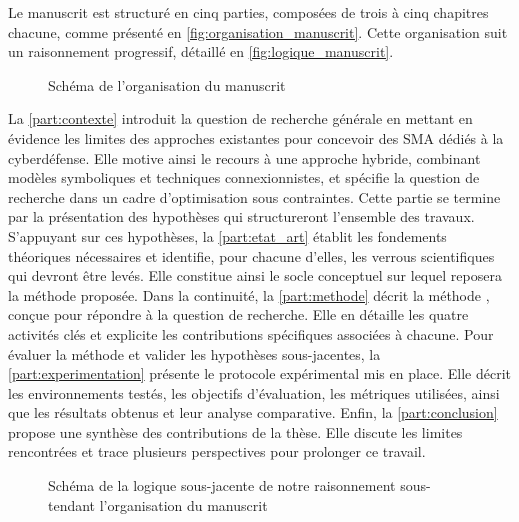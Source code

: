 \noindent
Le manuscrit est structuré en cinq parties, composées de trois à cinq chapitres chacune, comme présenté en \autoref{fig:organisation_manuscrit}. Cette organisation suit un raisonnement progressif, détaillé en \autoref{fig:logique_manuscrit}.


\begin{figure}[h!]
    \centering
    \resizebox{\textwidth}{!}{%
        
    }
    \caption{Schéma de l'organisation du manuscrit}
    \label{fig:organisation_manuscrit}
\end{figure}

\noindent
La \autoref{part:contexte} introduit la question de recherche générale en mettant en évidence les limites des approches existantes pour concevoir des SMA dédiés à la cyberdéfense. Elle motive ainsi le recours à une approche hybride, combinant modèles symboliques et techniques connexionnistes, et spécifie la question de recherche dans un cadre d’optimisation sous contraintes. Cette partie se termine par la présentation des hypothèses qui structureront l’ensemble des travaux.
%
S’appuyant sur ces hypothèses, la \autoref{part:etat_art} établit les fondements théoriques nécessaires et identifie, pour chacune d’elles, les verrous scientifiques qui devront être levés. Elle constitue ainsi le socle conceptuel sur lequel reposera la méthode proposée.
%
Dans la continuité, la \autoref{part:methode} décrit la méthode , conçue pour répondre à la question de recherche. Elle en détaille les quatre activités clés et explicite les contributions spécifiques associées à chacune.
%
Pour évaluer la méthode et valider les hypothèses sous-jacentes, la \autoref{part:experimentation} présente le protocole expérimental mis en place. Elle décrit les environnements testés, les objectifs d’évaluation, les métriques utilisées, ainsi que les résultats obtenus et leur analyse comparative.
%
Enfin, la \autoref{part:conclusion} propose une synthèse des contributions de la thèse. Elle discute les limites rencontrées et trace plusieurs perspectives pour prolonger ce travail.

%
\begin{figure}[h!]
    \centering
    \resizebox{\textwidth}{!}{%
        
    }
    \caption{Schéma de la logique sous-jacente de notre raisonnement sous-tendant l'organisation du manuscrit}
    \label{fig:logique_manuscrit}
\end{figure}

\cleardoublepage
